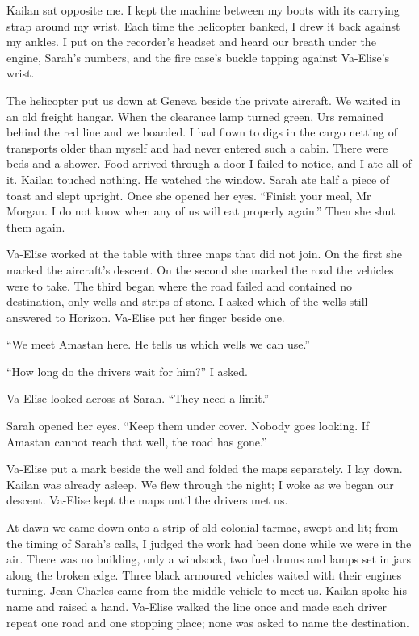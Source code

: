 Kailan sat opposite me. I kept the machine between my boots with its carrying strap around my wrist. Each time the helicopter banked, I drew it back against my ankles. I put on the recorder's headset and heard our breath under the engine, Sarah's numbers, and the fire case's buckle tapping against Va-Elise's wrist.\par

The helicopter put us down at Geneva beside the private aircraft. We waited in an old freight hangar. When the clearance lamp turned green, Urs remained behind the red line and we boarded. I had flown to digs in the cargo netting of transports older than myself and had never entered such a cabin. There were beds and a shower. Food arrived through a door I failed to notice, and I ate all of it. Kailan touched nothing. He watched the window. Sarah ate half a piece of toast and slept upright. Once she opened her eyes. ``Finish your meal, Mr Morgan. I do not know when any of us will eat properly again.'' Then she shut them again.\par

Va-Elise worked at the table with three maps that did not join. On the first she marked the aircraft's descent. On the second she marked the road the vehicles were to take. The third began where the road failed and contained no destination, only wells and strips of stone. I asked which of the wells still answered to Horizon. Va-Elise put her finger beside one.\par

``We meet Amastan here. He tells us which wells we can use.''\par

``How long do the drivers wait for him?'' I asked.\par

Va-Elise looked across at Sarah. ``They need a limit.''\par

Sarah opened her eyes. ``Keep them under cover. Nobody goes looking. If Amastan cannot reach that well, the road has gone.''\par

Va-Elise put a mark beside the well and folded the maps separately. I lay down. Kailan was already asleep. We flew through the night; I woke as we began our descent. Va-Elise kept the maps until the drivers met us.\par

\ornament

At dawn we came down onto a strip of old colonial tarmac, swept and lit; from the timing of Sarah's calls, I judged the work had been done while we were in the air. There was no building, only a windsock, two fuel drums and lamps set in jars along the broken edge. Three black armoured vehicles waited with their engines turning. Jean-Charles came from the middle vehicle to meet us. Kailan spoke his name and raised a hand. Va-Elise walked the line once and made each driver repeat one road and one stopping place; none was asked to name the destination.\par

